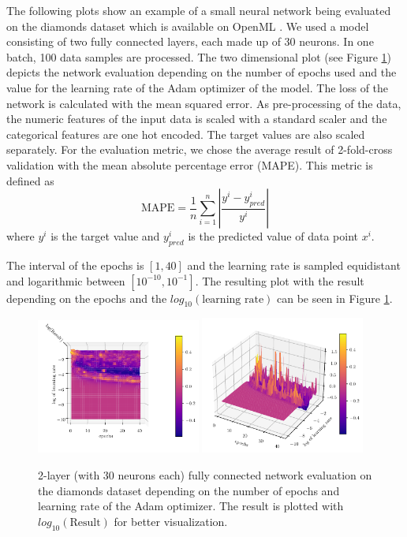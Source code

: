The following plots show an example of a small neural network being evaluated on the diamonds dataset which is available on OpenML \cite{feurer-arxiv19a}. We used a model consisting of two fully connected layers, each made up of 30 neurons. In one batch, 100 data samples are processed. The two dimensional plot (see Figure \ref{fig:analysis_model_training}) depicts the network evaluation depending on the number of epochs used and the value for the learning rate of the Adam optimizer of the model. The loss of the network is calculated with the mean squared error. As pre-processing of the data, the numeric features of the input data is scaled with a standard scaler and the categorical features are one hot encoded. The target values are also scaled separately. For the evaluation metric, we chose the average result of 2-fold-cross validation with the mean absolute percentage error (MAPE). This metric is defined as 
\begin{equation}
 	\text{MAPE} = \frac{1}{n} \sum_{i=1}^{n}\left|\frac{y^i - y^i_{pred}}{y^i}\right|
\end{equation}
where $ y^i $ is the target value and $ y^i_{pred} $ is the predicted value of data point $ x^i $.

The interval of the epochs is $ [1, 40] $ and the learning rate is sampled equidistant and logarithmic between $ [10^{-10}, 10^{-1}] $. The resulting plot with the result depending on the epochs and the $ log_{10}(\text{learning rate}) $ can be seen in Figure \ref{fig:analysis_model_training}.

\begin{figure}[htbp!]
	\centering
	\includegraphics[width=0.48\textwidth]{figures/Results/Machine_learning/1000_evaluations/Network_above}
	\includegraphics[width=0.48\textwidth]{figures/Results/Machine_learning/1000_evaluations/Network_normal}
	
	\caption{ 2-layer (with 30 neurons each) fully connected network evaluation on the diamonds dataset depending on the number of epochs and learning rate of the Adam optimizer. The result is plotted with $ log_{10}(\text{Result}) $ for better visualization. }
	\label{fig:analysis_model_training}
\end{figure}

